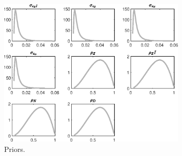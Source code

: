  
\begin{figure}[H]
\centering
\includegraphics[width=0.80\textwidth]{BRS/graphs/BRS_Priors1}
\caption{Priors.}\label{Fig:Priors:1}
\end{figure}
 
